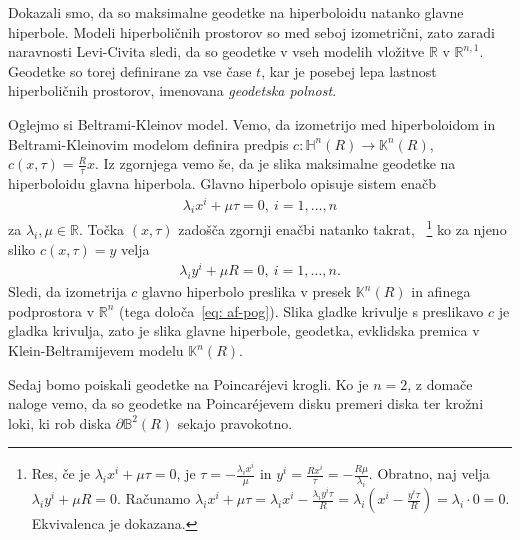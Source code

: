 \documentclass[a4paper]{article}
\begin{document}
Dokazali smo, da so maksimalne geodetke na hiperboloidu natanko glavne hiperbole. Modeli hiperboličnih prostorov so med seboj izometrični, zato zaradi naravnosti Levi-Civita sledi, da so geodetke v vseh modelih vložitve $\mathbb{R}$ v $\mathbb{R}^{n,1}$. Geodetke so torej definirane za vse čase $t$, kar je posebej lepa lastnost hiperboličnih prostorov, imenovana \emph{geodetska polnost}.\newline

Oglejmo si Beltrami-Kleinov model. Vemo, da izometrijo med hiperboloidom in Beltrami-Kleinovim modelom definira predpis $c \colon \mathbb{H}^{n}(R) \to \mathbb{K}^{n}(R)$, $c(x,\tau) = \frac{R}{\tau}x$. Iz zgornjega vemo še, da je slika maksimalne geodetke na hiperboloidu glavna hiperbola.
Glavno hiperbolo opisuje sistem enačb 
\begin{gather}
\lambda_{i}x^{i} + \mu \tau = 0, \ i=1, \dots , n
\end{gather}
za $\lambda_{i}, \mu \in \mathbb{R}$.
Točka $(x,\tau)$ zadošča zgornji enačbi natanko takrat,
~\footnote{Res, če je $\lambda_{i}x^{i}+\mu \tau=0$, je $\tau=-\frac{\lambda_{i}x^{i}}{\mu}$ in $y^{i}=\frac{Rx^{i}}{\tau}=-\frac{R\mu}{\lambda_{i}}$. 
Obratno, naj velja $\lambda_{i}y^{i} + \mu R = 0$. Računamo $\lambda_{i}x^{i}+\mu \tau = \lambda_{i}x^{i} - \frac{\lambda_{i}y^{i}\tau}{R} = \lambda_{i} (x^{i} - \frac{y^{i}\tau}{R}) = \lambda_{i} \cdot 0 = 0$. Ekvivalenca je dokazana.} 
ko za njeno sliko $c(x,\tau)=y$ velja 
\begin{gather}\label{eq: af-pog}
\lambda_{i}y^{i} + \mu R = 0, \ i=1, \dots , n.
\end{gather}
Sledi, da izometrija $c$ glavno hiperbolo preslika v presek $\mathbb{K}^{n}(R)$ in afinega podprostora v $\mathbb{R}^{n}$ (tega določa~\ref{eq: af-pog}). Slika gladke krivulje s preslikavo $c$ je gladka krivulja, zato je slika glavne hiperbole, geodetka, evklidska premica v Klein-Beltramijevem modelu $\mathbb{K}^{n}(R)$.\newline

Sedaj bomo poiskali geodetke na Poincar\'ejevi krogli.
Ko je $n=2$, z domače naloge vemo, da so geodetke na Poincar\'ejevem disku premeri diska ter krožni loki, ki rob diska $\partial \mathbb{B}^{2}(R)$ sekajo pravokotno.
\end{document}
